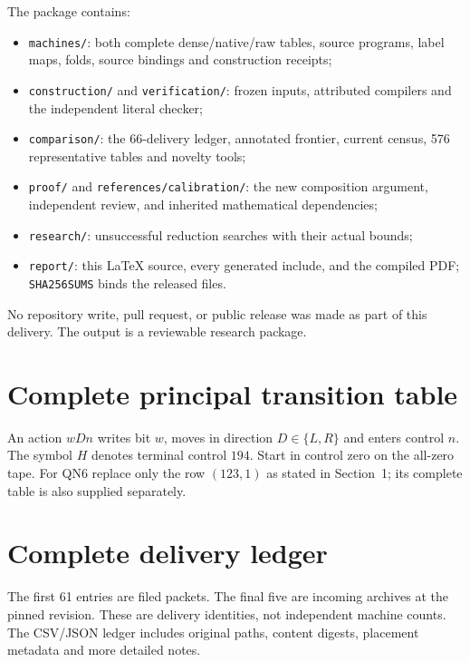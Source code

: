\documentclass[11pt,letterpaper]{article}
\newcommand{\file}[1]{\begingroup\def\UrlBreaks{\do\/\do\_\do\-\do\.}\texttt{\nolinkurl{#1}}\endgroup}
\begin{document}
The package contains:
\begin{itemize}
\item \file{machines/}: both complete dense/native/raw tables, source programs,
      label maps, folds, source bindings and construction receipts;
\item \file{construction/} and \file{verification/}: frozen inputs, attributed
      compilers and the independent literal checker;
\item \file{comparison/}: the 66-delivery ledger, annotated frontier,
      current census, 576 representative tables and novelty tools;
\item \file{proof/} and \file{references/calibration/}: the new composition
      argument, independent review, and inherited mathematical dependencies;
\item \file{research/}: unsuccessful reduction searches with their actual bounds;
\item \file{report/}: this LaTeX source, every generated include, and the compiled
      PDF; \file{SHA256SUMS} binds the released files.
\end{itemize}
No repository write, pull request, or public release was made as part of this
delivery. The output is a reviewable research package.

\clearpage
\appendix
\section{Complete principal transition table}
\label{app:table}
An action $wDn$ writes bit $w$, moves in direction $D\in\{L,R\}$ and enters
control $n$. The symbol $H$ denotes terminal control $194$. Start in control
zero on the all-zero tape. For QN6 replace only the row $(123,1)$ as stated
in Section~1; its complete table is also supplied separately.


\clearpage
\section{Complete delivery ledger}
\label{app:ledger}
The first 61 entries are filed packets. The final five are incoming archives
at the pinned revision. These are delivery identities, not independent
machine counts. The CSV/JSON ledger includes original paths, content digests,
placement metadata and more detailed notes.

\end{document}
